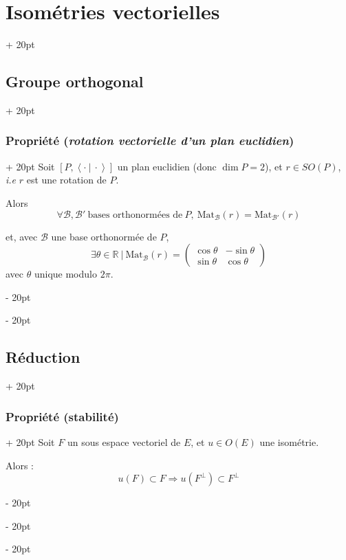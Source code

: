 \documentclass[a4paper, 12pt, twoside]{article}
\newcommand{\R}{\mathbb{R}} %
\newcommand{\lrangle}[1]{\left\langle #1 \right\rangle}
\newcommand{\ps}[2]{\lrangle{#1\ |\ #2}}
\newcommand{\ind}[1][20pt]{\advance\leftskip + #1}
\newcommand{\deind}[1][20pt]{\advance\leftskip - #1}
\newenvironment{indt}[2][20pt]{#2 \par \ind[#1]}{\par \deind} %
\begin{document}
\begin{indt}{\section{Isométries vectorielles}}
\begin{indt}{\subsection{Groupe orthogonal}}
            \begin{indt}{\subsubsection{Propriété (\textit{rotation vectorielle d'un plan euclidien})}}
                Soit $[P, \ps \cdot \cdot]$ un plan euclidien (donc $\dim P = 2$), et $r \in SO(P)$, \textit{i.e} $r$ est une rotation de $P$.

                Alors
                \[
                    \forall \mathcal B, \mathcal B'\ \text{bases orthonormées de}\ P,\
                    \mathrm{Mat}_{\mathcal B}(r) = \mathrm{Mat}_{\mathcal B'}(r)
                \]

                et, avec $\mathcal B$ une base orthonormée de $P$,
                \[
                    \exists \theta \in \R\ |\
                    \mathrm{Mat}_{\mathcal B}(r) =
                    \begin{pmatrix}
                        \cos \theta & -\sin \theta
                        \\
                        \sin \theta & \cos \theta
                    \end{pmatrix}
                \]
                avec $\theta$ unique modulo $2\pi$.
            \end{indt}
        \end{indt}

        \vspace{12pt}
        
        \begin{indt}{\subsection{Réduction}}
            \begin{indt}{\subsubsection{Propriété (stabilité)}}
                Soit $F$ un sous espace vectoriel de $E$, et $u \in O(E)$ une isométrie.
                
                Alors :
                \[
                    u(F) \subset F
                    \Rightarrow u(F^\perp) \subset F^\perp
                \]
            \end{indt}

            \vspace{12pt}
            

\end{indt}
\end{indt}
\end{document}
